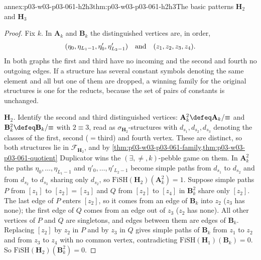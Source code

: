 \begin{annexitem}{annex:p03-w03-p03-061-h2h3}{thm:p03-w03-p03-061-h2h3}{The basic patterns \(\mathbf H_2\) and \(\mathbf H_3\)}
\begin{proof}
Fix \(k\). In \(\mathbf A_k\) and \(\mathbf B_k\) the distinguished vertices
are, in order,
\[
 (\eta_0,\eta_{L_1-1},\eta'_0,\eta'_{L_2-1})
 \quad\hbox{and}\quad(z_1,z_2,z_3,z_4).
\] In both graphs the first and third have no incoming and
the second and fourth no outgoing edges. If a structure has several constant
symbols denoting the same element and all but one of them are dropped, a
winning family for the original structures is one for the reducts, because
the set of pairs of constants is unchanged.

\emph{\(\mathbf H_2\).} Identify the second and third distinguished
vertices: \(\mathbf A^2_k\defeq\mathbf A_k/{\equiv}\) and \(\mathbf
B^2_k\defeq\mathbf B_k/{\equiv}\) with \(2\equiv3\), read as
\(\sigma_{\mathbf H_2}\)-structures with \(d_{s_1},d_{s_2},d_{s_3}\) denoting
the classes of the first, second (\(=\)third) and fourth vertex. These are
distinct, so both structures lie in \(\mathcal F_{\mathbf H_2}\), and by
\cref{thm:p03-w03-p03-061-family,thm:p03-w03-p03-061-quotient} Duplicator
wins the \((\exists,\neq,k)\)-pebble game on them. In \(\mathbf A^2_k\) the
paths \(\eta_0,\ldots,\eta_{L_1-1}\) and \(\eta'_0,\ldots,\eta'_{L_2-1}\)
become simple paths from \(d_{s_1}\) to \(d_{s_2}\) and from \(d_{s_2}\) to
\(d_{s_3}\) sharing only \(d_{s_2}\), so \(\mathrm{FiSH}(\mathbf
H_2)(\mathbf A^2_k)=1\). Suppose simple paths \(P\) from \([z_1]\) to
\([z_2]=[z_3]\) and \(Q\) from \([z_2]\) to \([z_4]\) in \(\mathbf B^2_k\)
share only \([z_2]\). The last edge of \(P\) enters \([z_2]\), so it comes
from an edge of \(\mathbf B_k\) into \(z_2\) (\(z_3\) has none); the first edge
of \(Q\) comes from an edge out of \(z_3\) (\(z_2\) has none). All other
vertices of \(P\) and \(Q\) are singletons, and edges between them are edges
of \(\mathbf B_k\). Replacing \([z_2]\) by \(z_2\) in \(P\) and by \(z_3\) in
\(Q\) gives simple paths of \(\mathbf B_k\) from \(z_1\) to \(z_2\) and from
\(z_3\) to \(z_4\) with no common vertex, contradicting
\(\mathrm{FiSH}(\mathbf H_1)(\mathbf B_k)=0\). So
\(\mathrm{FiSH}(\mathbf H_2)(\mathbf B^2_k)=0\).


\end{proof}
\end{annexitem}

